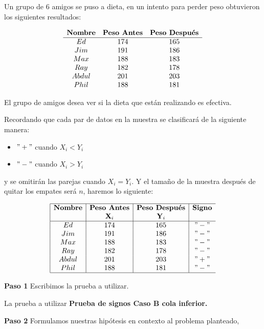 \documentclass[
  a4paper,
  oneside,
  openany]{book}
\providecommand{\tightlist}{%
  \setlength{\itemsep}{0pt}\setlength{\parskip}{0pt}}
\begin{document}
Un grupo de 6 amigos se puso a dieta, en un intento para perder peso obtuvieron los siguientes resultados:

\[
\begin{array}{c c c c } 
\textbf{Nombre} & \textbf{Peso Antes} & \textbf{Peso Después} \\
\hline
Ed    & 174 & 165 \\
Jim   & 191 & 186 \\
Max   & 188 & 183 \\
Ray   & 182 & 178 \\
Abdul & 201 & 203 \\
Phil  & 188 & 181 \\
\end{array} 
\]

El grupo de amigos desea ver si la dieta que están realizando es efectiva.

Recordando que cada par de datos en la muestra se clasificará de la siguiente manera:

\begin{itemize}
\tightlist
\item
  \("+"\) cuando \(X_{i} < Y_{i}\)
\item
  \("-"\) cuando \(X_{i} > Y_{i}\)
\end{itemize}

y se omitirán las parejas cuando \(X_i = Y_i\). Y el tamaño de la muestra después de quitar los empates será \(n\), haremos lo siguiente:

\[
\begin{array}{|c |c |c |c c c|}
\hline
\textbf{Nombre} & \textbf{Peso Antes} & \textbf{Peso Después} & \textbf{Signo} \\
 & \textbf{X}_i & \textbf{Y}_i & \\
 \hline
Ed    & 174 & 165  &  "-"   \\
Jim   & 191 & 186  &  "-" \\
Max   & 188 & 183  &  "-" \\
Ray   & 182 & 178  &  "-" \\
Abdul & 201 & 203  &  "+" \\
Phil  & 188 & 181  &  "-"  \\
\hline
\end{array} 
\]

\textbf{Paso 1} Escribimos la prueba a utilizar.

La prueba a utilizar \textbf{Prueba de signos Caso B cola inferior.}

\textbf{Paso 2} Formulamos nuestras hipótesis en contexto al problema planteado,
\end{document}
